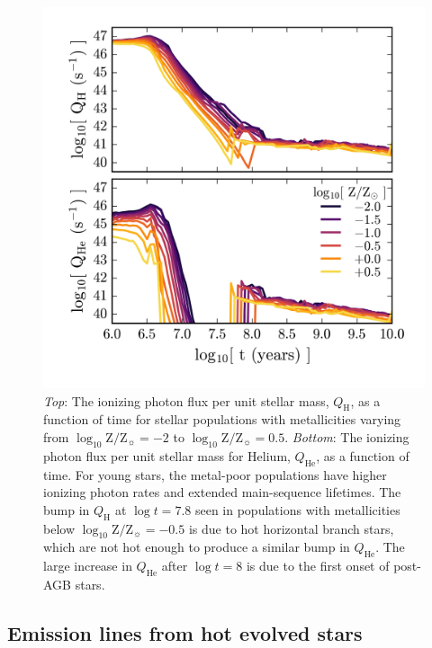 \documentclass[preprint2]{aastex62}
\newcommand{\logten}{\ensuremath{\log_{10}}}
\newcommand{\logZeq}[1]{\ensuremath{\logten \mathrm{Z}/\mathrm{Z}_{\sun} = #1}}
\newcommand{\QH}{\ensuremath{Q_{\mathrm{H}}}\xspace}
\newcommand{\QHe}{\ensuremath{Q_{\mathrm{He}}}\xspace}
\begin{document}
\begin{figure}
  \begin{center}
    \includegraphics[width=\linewidth]{figs/f4.png}
    \caption{\emph{Top}: The ionizing photon flux per unit stellar mass, \QH, as a function of time for stellar populations with metallicities varying from \logZeq{-2} to \logZeq{0.5}. \emph{Bottom}: The ionizing photon flux per unit stellar mass for Helium, \QHe, as a function of time. For young stars, the metal-poor populations have higher ionizing photon rates and extended main-sequence lifetimes. The bump in \QH at $\log t = 7.8$ seen in populations with metallicities below \logZeq{-0.5} is due to hot horizontal branch stars, which are not hot enough to produce a similar bump in \QHe. The large increase in \QHe after $\log t = 8$ is due to the first onset of post-AGB stars.}
    \label{fig:popQs}
  \end{center}
\end{figure}
\subsection{Emission lines from hot evolved stars} \label{sec:stars:emis}
\end{document}
